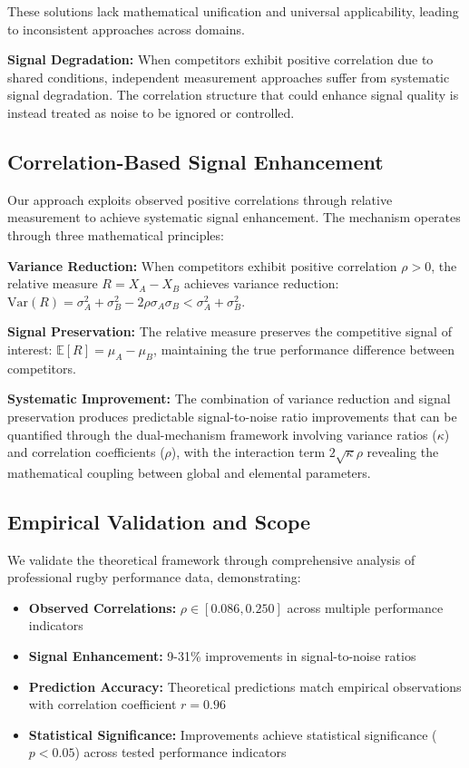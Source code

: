 These solutions lack mathematical unification and universal applicability, leading to inconsistent approaches across domains.

\textbf{Signal Degradation:}
When competitors exhibit positive correlation due to shared conditions, independent measurement approaches suffer from systematic signal degradation. The correlation structure that could enhance signal quality is instead treated as noise to be ignored or controlled.

\subsection{Correlation-Based Signal Enhancement}

Our approach exploits observed positive correlations through relative measurement to achieve systematic signal enhancement. The mechanism operates through three mathematical principles:

\textbf{Variance Reduction:} When competitors exhibit positive correlation $\rho > 0$, the relative measure $R = X_A - X_B$ achieves variance reduction: $\text{Var}(R) = \sigma^2_A + \sigma^2_B - 2\rho\sigma_A\sigma_B < \sigma^2_A + \sigma^2_B$.

\textbf{Signal Preservation:} The relative measure preserves the competitive signal of interest: $\mathbb{E}[R] = \mu_A - \mu_B$, maintaining the true performance difference between competitors.

\textbf{Systematic Improvement:} The combination of variance reduction and signal preservation produces predictable signal-to-noise ratio improvements that can be quantified through the dual-mechanism framework involving variance ratios ($\kappa$) and correlation coefficients ($\rho$), with the interaction term $2\sqrt{\kappa}\rho$ revealing the mathematical coupling between global and elemental parameters.

\subsection{Empirical Validation and Scope}

We validate the theoretical framework through comprehensive analysis of professional rugby performance data, demonstrating:

\begin{itemize}
    \item \textbf{Observed Correlations:} $\rho \in [0.086, 0.250]$ across multiple performance indicators
    \item \textbf{Signal Enhancement:} 9-31\% improvements in signal-to-noise ratios  
    \item \textbf{Prediction Accuracy:} Theoretical predictions match empirical observations with correlation coefficient $r = 0.96$
    \item \textbf{Statistical Significance:} Improvements achieve statistical significance ($p < 0.05$) across tested performance indicators
\end{itemize}

